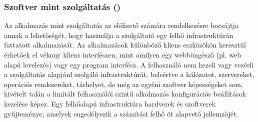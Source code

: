 \subsubsection{Szoftver mint szolgáltatás ()}

Az alkalmazás mint szolgáltatás az előfizető számára rendelkezésre bocsájtja annak a lehetőségét, hogy használja a szolgáltató egy felhő infrastruktúrán futtatott alkalmazását. Az alkalmazások különböző kliens eszközökön keresztül érhetőek el vékony kliens interfészen, mint amilyen egy webböngésző (pl. web alapú levelezés) vagy egy program interfész. A felhasználó nem kezeli vagy vezérli a szolgáltatás alapjául szolgáló infrastruktúrát, beleértve a hálózatot, szervereket, operációs rendszereket, tárhelyet, de még az egyéni szoftver képességeket sem, kivételt talán a limitált felhasználói szintű alkalmazás konfigurációs beállítások kezelése képez. Egy felhőalapú infrastruktúra hardverek és szoftverek gyűjteménye, amelyek engedélyezik a számítási felhő öt alapvető jellemzőjét.

